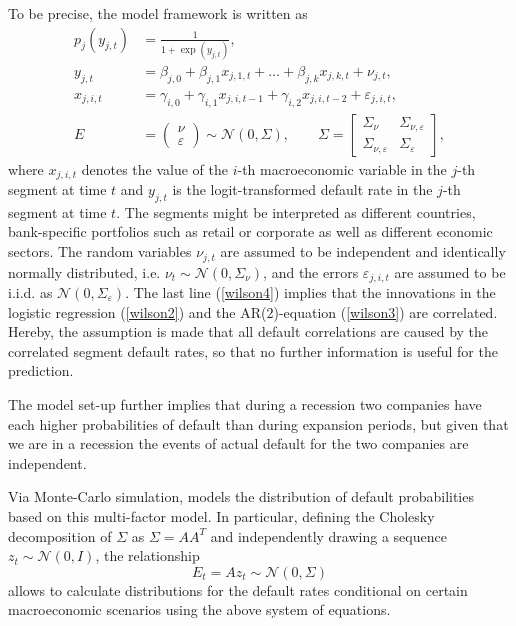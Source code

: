 \documentclass[a4paper, 12pt]{scrreprt}
\begin{document}
To be precise, the \textcite{wilson1997wilsonI} model framework is written as
\begin{align}
p_j(y_{j,t}) &= \frac{1}{1+\exp(y_{j,t})}, \label{wilson1}\\
y_{j,t} &=  \beta_{j,0} + \beta_{j,1} x_{j,1,t} + \ldots + \beta_{j,k} x_{j,k,t} + \nu_{j,t}, \label{wilson2} \\
x_{j,i,t} &= \gamma_{i,0} + \gamma_{i,1} x_{j,i,t-1} + \gamma_{i,2} x_{j,i,t-2} + \varepsilon_{j,i,t}, \label{wilson3} \\
E &= \begin{pmatrix} \nu \\ \varepsilon \end{pmatrix}
 \sim \mathcal{N}(0, \Sigma), \qquad \Sigma = \begin{bmatrix} \Sigma_\nu & \Sigma_{\nu,\varepsilon} \\ \Sigma_{\nu,\varepsilon} & \Sigma_\varepsilon \end{bmatrix}, \label{wilson4}
\end{align}
where $x_{j,i,t}$ denotes the value of the $i$-th macroeconomic variable in the $j$-th segment at time $t$ and $y_{j,t}$ is the logit-transformed default rate in the $j$-th segment at time $t$. 
The segments might be interpreted as different countries, bank-specific portfolios such as retail or corporate as well as different economic sectors.
The random variables $\nu_{j,t}$ are assumed to be independent and identically normally distributed, i.e. $\nu_t \sim \mathcal{N}(0, \Sigma_\nu)$, and the errors $\varepsilon_{j,i,t}$ are assumed to be i.i.d. as $\mathcal{N}(0, \Sigma_\varepsilon)$.
The last line (\ref{wilson4}) implies that the innovations in the logistic regression (\ref{wilson2}) and the AR(2)-equation (\ref{wilson3}) are correlated.
Hereby, the assumption is made that all default correlations are caused by the correlated  segment default rates, so that no further information is useful for the prediction.

The model set-up further implies that during a recession two companies have each higher probabilities of default than during expansion periods, but given that we are in a recession the events of actual default for the two companies are independent.

Via Monte-Carlo simulation, \textcite{wilson1997wilsonII} models the distribution of default probabilities based on this multi-factor model. In particular, defining the Cholesky decomposition of $\Sigma$ as $\Sigma = AA^T$ and independently drawing a sequence $z_t \sim \mathcal{N}(0, I)$, the relationship
\[ E_t = A z_t \sim \mathcal{N}(0, \Sigma) \]
allows to calculate distributions for the default rates conditional on certain macroeconomic scenarios using the above system of equations.
\end{document}
